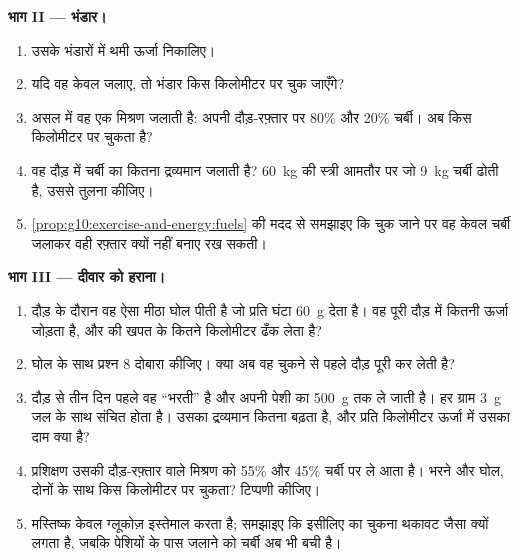 \begin{problem}
\medskip
\noindent\textbf{भाग II --- भंडार।}
\begin{enumerate}[resume]
  \item उसके  भंडारों में थमी ऊर्जा निकालिए।
  \item यदि वह केवल  जलाए, तो भंडार किस किलोमीटर पर चुक
        जाएँगे?
  \item असल में वह एक मिश्रण जलाती है: अपनी दौड़-रफ़्तार पर 80\%
         और 20\% चर्बी। अब  किस किलोमीटर पर चुकता
        है?
  \item वह दौड़ में चर्बी का कितना द्रव्यमान जलाती है? \qty{60}{kg} की
        स्त्री आमतौर पर जो \qty{9}{kg} चर्बी ढोती है, उससे तुलना कीजिए।
  \item \cref{prop:g10:exercise-and-energy:fuels} की मदद से समझाइए कि
         चुक जाने पर वह केवल चर्बी जलाकर वही रफ़्तार क्यों नहीं
        बनाए रख सकती।
\end{enumerate}

\medskip
\noindent\textbf{भाग III --- दीवार को हराना।}
\begin{enumerate}[resume]
  \item दौड़ के दौरान वह ऐसा मीठा घोल पीती है जो प्रति घंटा \qty{60}{g}
         देता है। वह पूरी दौड़ में कितनी ऊर्जा जोड़ता है,
        और  की खपत के कितने किलोमीटर ढँक लेता है?
  \item घोल के साथ प्रश्न 8 दोबारा कीजिए। क्या अब वह  चुकने से
        पहले दौड़ पूरी कर लेती है?
  \item दौड़ से तीन दिन पहले वह  ``भरती'' है और अपनी पेशी
        का  \qty{500}{g} तक ले जाती है। हर ग्राम \qty{3}{g} जल
        के साथ संचित होता है। उसका द्रव्यमान कितना बढ़ता है, और प्रति
        किलोमीटर ऊर्जा में उसका दाम क्या है?
  \item प्रशिक्षण उसकी दौड़-रफ़्तार वाले मिश्रण को 55\% 
        और 45\% चर्बी पर ले आता है। भरने और घोल, दोनों के साथ 
        किस किलोमीटर पर चुकता? टिप्पणी कीजिए।
  \item मस्तिष्क केवल ग्लूकोज़ इस्तेमाल करता है; समझाइए कि इसीलिए
         का चुकना थकावट जैसा क्यों लगता है, जबकि पेशियों के पास
        जलाने को चर्बी अब भी बची है।
\end{enumerate}


\end{problem}
